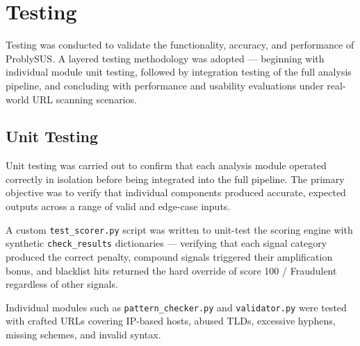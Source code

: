 \chapter{Testing}

Testing was conducted to validate the functionality, accuracy, and performance of ProblySUS. A layered testing methodology was adopted — beginning with individual module unit testing, followed by integration testing of the full analysis pipeline, and concluding with performance and usability evaluations under real-world URL scanning scenarios.

\section{Unit Testing}

Unit testing was carried out to confirm that each analysis module operated correctly in isolation before being integrated into the full pipeline. The primary objective was to verify that individual components produced accurate, expected outputs across a range of valid and edge-case inputs.

A custom \texttt{test\_scorer.py} script was written to unit-test the scoring engine with synthetic \texttt{check\_results} dictionaries — verifying that each signal category produced the correct penalty, compound signals triggered their amplification bonus, and blacklist hits returned the hard override of score 100 / Fraudulent regardless of other signals.

Individual modules such as \texttt{pattern\_checker.py} and \texttt{validator.py} were tested with crafted URLs covering IP-based hosts, abused TLDs, excessive hyphens, missing schemes, and invalid syntax.

